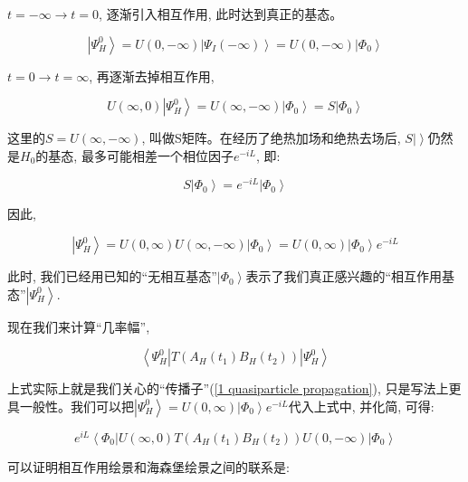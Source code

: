 $t= - \infty \to t=0$, 逐渐引入相互作用, 此时达到真正的基态。

\begin{equation*}
\left|\Psi_H^0 \right\rangle = U(0, -\infty) \left| \Psi_I(-\infty)
\right\rangle =  U(0, -\infty) \left| \Phi_0 \right\rangle
\end{equation*}


$t=0 \to t = \infty$, 再逐渐去掉相互作用,

\begin{equation*}
U(\infty,0) \left|\Psi_H^0 \right\rangle =
U(\infty,-\infty)\left|\Phi_0 \right\rangle = S\left|\Phi_0
\right\rangle
\end{equation*}

这里的$S = U(\infty, -\infty)$,
叫做S矩阵。在经历了绝热加场和绝热去场后, $S \left|
\right\rangle$仍然是$H_0$的基态, 最多可能相差一个相位因子$e^{-iL}$,
即:


\begin{equation}\label{S matrix}
S \left| \Phi_0 \right\rangle = e^{-iL} \left| \Phi_0 \right\rangle
\end{equation}

因此,

\begin{equation*}
\left| \Psi_H^0 \right\rangle = U(0, \infty) U(\infty, -\infty)
\left| \Phi_0 \right\rangle = U(0, \infty) \left| \Phi_0
\right\rangle e^{-iL}
\end{equation*}

此时, 我们已经用已知的“无相互基态”$\left| \Phi_0
\right\rangle$表示了我们真正感兴趣的“相互作用基态”$\left| \Psi_H^0
\right\rangle$.

现在我们来计算“几率幅”,

\begin{equation}\label{TAHBH}
\left\langle \Psi_H^0 \right| T \left( A_H(t_1) B_H(t_2) \right)
\left| \Psi_H^0 \right\rangle
\end{equation}

上式实际上就是我们关心的“传播子”(\ref{1 quasiparticle
propagation}), 只是写法上更具一般性。我们可以把$\left| \Psi_H^0 \right\rangle = U(0, \infty) \left| \Phi_0 \right\rangle
e^{-iL}$代入上式中, 并化简, 可得:


\begin{equation*}
e^{iL} \left\langle \Phi_0 \right| U(\infty, 0) T \left( A_H (t_1)
B_H(t_2) \right) U(0, -\infty) \left| \Phi_0 \right\rangle
\end{equation*}


可以证明相互作用绘景和海森堡绘景之间的联系是:

